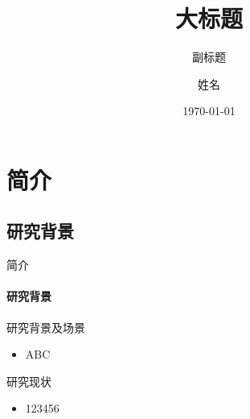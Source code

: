 \documentclass[
10pt,
aspectratio=169,
]{beamer}
\title{大标题}
\subtitle{副标题}
\author[Terry]{姓名}
\institute[SUN YAT-SEN UNIVERSITY]{指导老师：\\XX学院\\
中山大学}
\date{\today}
\begin{document}
\maketitle


\section{简介}
\subsection{研究背景}
\begin{frame}[c]{简介}
	\framesubtitle{研究背景}
\begin{block}{研究背景及场景}
\begin{itemize}
	\item ABC
\end{itemize}
\end{block}

\begin{block}{研究现状}
	\begin{itemize}
	\item 123456
	\end{itemize}
\end{block}

%

\end{frame}	
\end{document}
